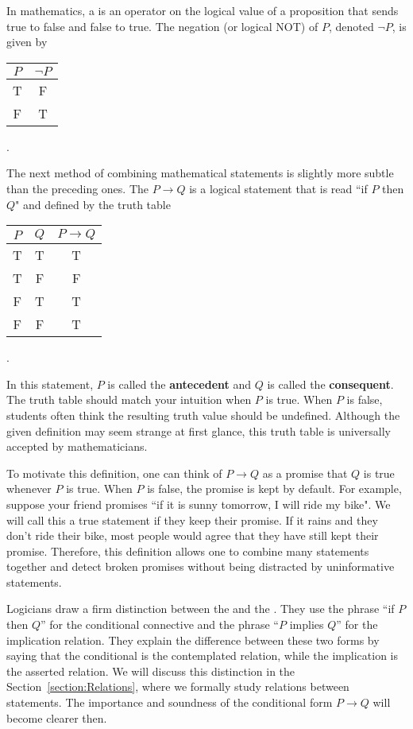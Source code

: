 In mathematics, a  is an operator on the logical value of a proposition that sends true to false and false to true.
The negation (or logical NOT) of $P$, denoted $\neg P$, is given by
\begin{center}
\begin{tabular}{|c|c|}
\hline
$P$ & $\neg P$ \tabularnewline
\hline
T & F \tabularnewline
F & T \tabularnewline
\hline
\end{tabular} .
\end{center}



The next method of combining mathematical statements is slightly more subtle than the preceding ones.
The  $P \rightarrow Q$ is a logical statement that is read ``if $P$ then $Q$" and defined by the truth table
\begin{center}
\begin{tabular}{|c|c|c|}
\hline
$P$ & $Q$ & $P \rightarrow Q$ \tabularnewline
\hline
T & T & T \tabularnewline
T & F & F \tabularnewline
F & T & T \tabularnewline
F & F & T \tabularnewline
\hline
\end{tabular} .
\end{center}
In this statement, $P$ is called the \textbf{antecedent} and $Q$ is called the \textbf{consequent}.
The truth table should match your intuition when $P$ is true.
When $P$ is false, students often think the resulting truth value should be undefined.
Although the given definition may seem strange at first glance, this truth table is universally accepted by mathematicians.

To motivate this definition, one can think of $P \rightarrow Q$ as a promise that $Q$ is true whenever $P$ is true.
When $P$ is false, the promise is kept by default.
For example, suppose your friend promises ``if it is sunny tomorrow, I will ride my bike".
We will call this a true statement if they keep their promise.
If it rains and they don't ride their bike, most people would agree that they have still kept their promise.
Therefore, this definition allows one to combine many statements together and detect broken promises without being distracted by uninformative statements.

Logicians draw a firm distinction between the  and the .
They use the phrase ``if $P$ then $Q$'' for the conditional connective and the phrase ``$P$ implies $Q$'' for the implication relation.
They explain the difference between these two forms by saying that the conditional is the contemplated relation, while the implication is the asserted relation.
We will discuss this distinction in the Section~\ref{section:Relations}, where we formally study relations between statements.
The importance and soundness of the conditional form $P \rightarrow Q$ will become clearer then.

